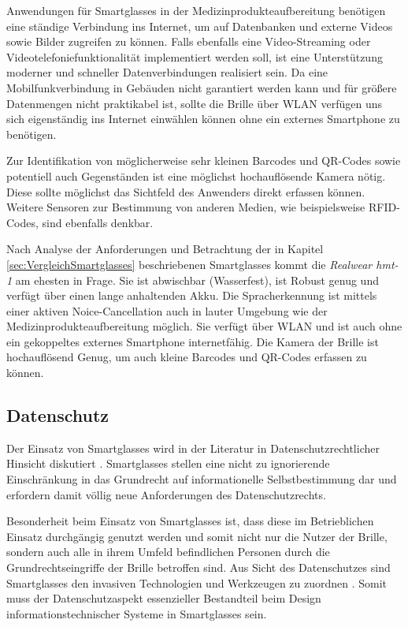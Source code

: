 Anwendungen für Smartglasses in der Medizinprodukteaufbereitung benötigen eine ständige Verbindung ins Internet, um auf Datenbanken und externe Videos sowie Bilder zugreifen zu können. Falls ebenfalls eine Video-Streaming oder Videotelefoniefunktionalität implementiert werden soll, ist eine Unterstützung moderner und schneller Datenverbindungen realisiert sein. Da eine Mobilfunkverbindung in Gebäuden nicht garantiert werden kann und für größere Datenmengen nicht praktikabel ist, sollte die Brille über WLAN verfügen uns sich eigenständig ins Internet einwählen können ohne ein externes Smartphone zu benötigen.

Zur Identifikation von möglicherweise sehr kleinen Barcodes und QR-Codes sowie potentiell auch Gegenständen ist eine möglichst hochauflösende Kamera nötig. Diese sollte möglichst das Sichtfeld des Anwenders direkt erfassen können. Weitere Sensoren zur Bestimmung von anderen Medien, wie beispielsweise RFID-Codes, sind ebenfalls denkbar.

Nach Analyse der Anforderungen und Betrachtung der in Kapitel \ref{sec:VergleichSmartglasses} beschriebenen Smartglasses kommt die \emph{Realwear hmt-1} am ehesten in Frage. Sie ist abwischbar (Wasserfest), ist Robust genug und verfügt über einen lange anhaltenden Akku. Die Spracherkennung ist mittels einer aktiven Noice-Cancellation auch in lauter Umgebung wie der Medizinprodukteaufbereitung möglich. Sie verfügt über WLAN und ist auch ohne ein gekoppeltes externes Smartphone internetfähig. Die Kamera der Brille ist hochauflösend Genug, um auch kleine Barcodes und QR-Codes erfassen zu können.
%
%
\subsection{Datenschutz}
Der Einsatz von Smartglasses wird in der Literatur in Datenschutzrechtlicher Hinsicht diskutiert \cite{Berkemeier2017}. Smartglasses stellen eine nicht zu ignorierende Einschränkung in das Grundrecht auf informationelle Selbstbestimmung dar und erfordern damit völlig neue Anforderungen des Datenschutzrechts.

Besonderheit beim Einsatz von Smartglasses ist, dass diese im Betrieblichen Einsatz durchgängig genutzt werden und somit nicht nur die Nutzer der Brille, sondern auch alle in ihrem Umfeld befindlichen Personen durch die Grundrechtseingriffe der Brille betroffen sind. Aus Sicht des Datenschutzes sind Smartglasses den invasiven Technologien und Werkzeugen zu zuordnen \cite{Berkemeier2017}. Somit muss der Datenschutzaspekt essenzieller Bestandteil beim Design informationstechnischer Systeme in Smartglasses sein. 

